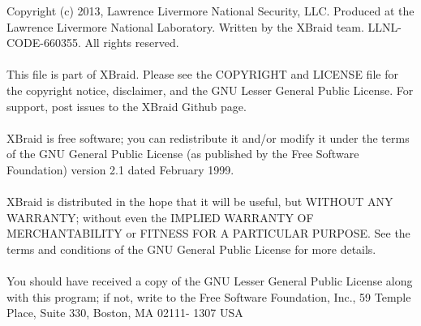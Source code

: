 \documentclass[twoside]{article}
\newcommand{\+}{\discretionary{\mbox{\scriptsize$\hookleftarrow$}}{}{}}
\begin{document}
\begin{titlepage}
Copyright (c) 2013,  Lawrence Livermore National Security, LLC.
Produced at the Lawrence Livermore National Laboratory.
Written by the XBraid team. LLNL-CODE-660355.  All rights reserved.
~\\~\\ 
This file is part of XBraid. Please see the COPYRIGHT and LICENSE file 
for the copyright notice, disclaimer, and the GNU Lesser General Public License.
For support, post issues to the XBraid Github page.
~\\~\\
XBraid is free software; you can redistribute it and/or modify it under the
terms of the GNU General Public License (as published by the Free Software
Foundation) version 2.1 dated February 1999.
~\\~\\
XBraid is distributed in the hope that it will be useful, but WITHOUT ANY
WARRANTY; without even the IMPLIED WARRANTY OF MERCHANTABILITY or FITNESS FOR A
PARTICULAR PURPOSE. See the terms and conditions of the GNU General Public
License for more details.
~\\~\\
You should have received a copy of the GNU Lesser General Public License along
with this program; if not, write to the Free Software Foundation, Inc., 59
Temple Place, Suite 330, Boston, MA 02111- 1307 USA

\end{titlepage}
\tableofcontents
{}
\hypersetup{pageanchor=true}

\end{document}
